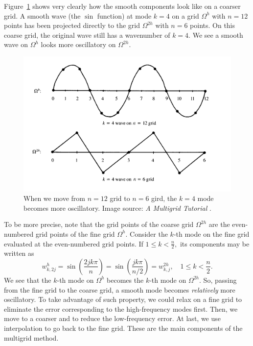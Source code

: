 \documentclass[letterpaper,12pt]{article}
\begin{document}
Figure~\ref{fig:2} shows very clearly how the smooth components look like on a coarser grid. A smooth wave (the $\sin$ function) at mode $k = 4$ on a grid $\Omega^h$ with $n = 12$ points has been projected directly to
the grid $\Omega^{2h}$ with $n = 6$ points. On this coarse grid, the original wave still has a wavenumber of $k = 4$. We see a smooth wave on $\Omega^{h}$ looks more oscillatory on $\Omega^{2h}$.

\begin{figure}
\centering 
\includegraphics[scale=0.4]{1.png}
\caption{When we move from $n=12$ grid to $n=6$ gird, the $k=4$ mode becomes more oscillatory. Image source: \textit{A Multigrid Tutorial} \cite[page 32]{10.5555/357695}.}\label{fig:2}
\end{figure}



To be more precise, note that the grid points of the coarse grid $\Omega^{2h}$ are the even-numbered grid points of the fine grid $\Omega^{h}$. Consider the $k$-th mode on the fine grid evaluated at the even-numbered grid points. If $1 \leq k<\frac{n}{2},$ its components may be written as
\begin{equation}
w_{k, 2 j}^{h}=\sin \left(\frac{2 j k \pi}{n}\right)=\sin \left(\frac{j k \pi}{n / 2}\right)=w_{k, j}^{2 h}, \quad 1 \leq k<\frac{n}{2}.
\end{equation}
We see that the $k$-th mode on $\Omega^{h}$ becomes the $k$-th mode on $\Omega^{2h}$. So, passing from the fine grid to the coarse grid, a smooth mode becomes \textit{relatively} more oscillatory. To take advantage of such property, we could relax on a fine grid to eliminate the error corresponding to the high-frequency modes first. Then, we move to a coarser and to reduce the low-frequency error. At last, we use interpolation to go back to the fine grid. These are the main components of the multigrid method. 
\end{document}

